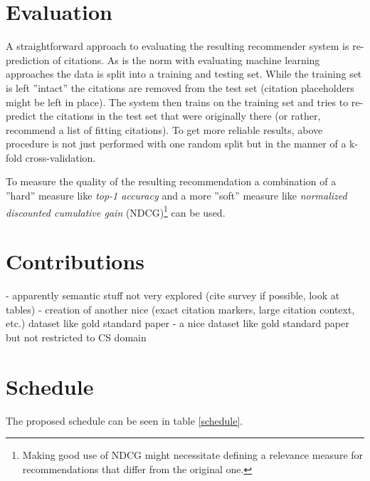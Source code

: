 \documentclass{proseminar}
\begin{document}
\section{Evaluation}
A straightforward approach to evaluating the resulting recommender system is re-prediction of citations. As is the norm with evaluating machine learning approaches the data is split into a training and testing set. While the training set is left ''intact'' the citations are removed from the test set (citation placeholders might be left in place). The system then trains on the training set and tries to re-predict the citations in the test set that were originally there (or rather, recommend a list of fitting citations). To get more reliable results, above procedure is not just performed with one random split but in the manner of a k-fold cross-validation.

To measure the quality of the resulting recommendation a combination of a ''hard'' measure like \emph{top-1 accuracy} and a more ''soft'' measure like \emph{normalized discounted cumulative gain} (NDCG)\footnote{Making good use of NDCG might necessitate defining a relevance measure for recommendations that differ from the original one.} can be used.

\section{Contributions}
- apparently semantic stuff not very explored (cite survey if possible, look at tables)  
- creation of another nice (exact citation markers, large citation context, etc.) dataset like gold standard paper\cite{Faerber2018}  
- a nice dataset like gold standard paper\cite{Faerber2018} but not restricted to CS domain

\section{Schedule}
The proposed schedule can be seen in table \ref{schedule}.
\end{document}
